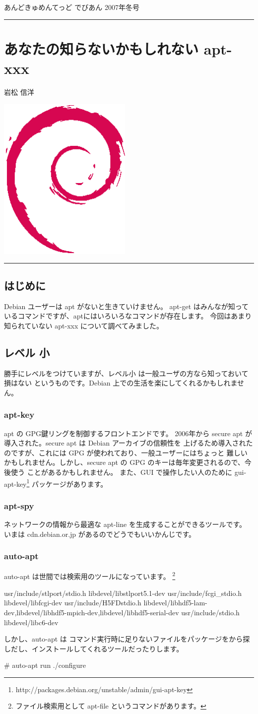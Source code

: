 \documentclass[mingoth,a4paper]{jsarticle}
\renewcommand{\dancersection}[2]{%
\newpage
あんどきゅめんてっど でびあん 2007年冬号
%
\vspace{0.1mm}\\
{\color{dancerlightblue}\rule{\hsize}{2mm}}

%
%
\begin{minipage}[t]{0.7\hsize}
\color{dancerdarkblue}
\vspace{1cm}
\section{#1}
\hfill{}#2\\
\end{minipage}
\begin{minipage}[t]{0.3\hsize}
\vspace{-2cm}
\hfill{}\includegraphics[height=8cm]{image200502/openlogo-nd.eps}\\
\vspace{-5cm}
\end{minipage}
%
%
{\color{dancerdarkblue}\rule{0.74\hsize}{2mm}}
%
\vspace{2cm}
}
\begin{document}
\dancersection{あなたの知らないかもしれない apt-xxx}{岩松 信洋}
\label{aptxxx}
\subsection{はじめに}
Debian ユーザーは apt がないと生きていけません。
apt-get はみんなが知っているコマンドですが、aptにはいろいろなコマンドが存在します。
今回はあまり知られていない apt-xxx について調べてみました。

\subsection{レベル 小}
勝手にレベルをつけていますが、レベル小 は一般ユーザの方なら知っておいて損はない
というものです。Debian 上での生活を楽にしてくれるかもしれません。


\subsubsection{apt-key}
 apt の GPG鍵リングを制御するフロントエンドです。
 2006年から secure apt が導入された。secure apt は Debian アーカイブの信頼性を
 上げるため導入されたのですが、これには GPG が使われており、一般ユーザーにはちょっと
 難しいかもしれません。しかし、secure apt の GPG のキーは毎年変更されるので、今後使う
 ことがあるかもしれません。
 また、GUI で操作したい人のために 
 gui-apt-key\footnote{http://packages.debian.org/unstable/admin/gui-apt-key} 
 パッケージがあります。
 
\subsubsection{apt-spy}
 ネットワークの情報から最適な apt-line を生成することができるツールです。
 いまは cdn.debian.or.jp があるのでどうでもいいかんじです。

\subsubsection{auto-apt}
 auto-apt は世間では検索用のツールになっています。
 \footnote{ファイル検索用として apt-file というコマンドがあります。}
 \begin{commandline}
 usr/include/stlport/stdio.h     libdevel/libstlport5.1-dev
 usr/include/fcgi_stdio.h        libdevel/libfcgi-dev
 usr/include/H5FDstdio.h libdevel/libhdf5-lam-dev,libdevel/libhdf5-mpich-dev,libdevel/libhdf5-serial-dev
 usr/include/stdio.h     libdevel/libc6-dev
 \end{commandline}
 しかし、auto-apt は コマンド実行時に足りないファイルをパッケージをから探しだし、インストールしてくれるツールだったりします。
 \begin{commandline}
 # auto-apt run ./configure
 \end{commandline}
 
\end{document}
